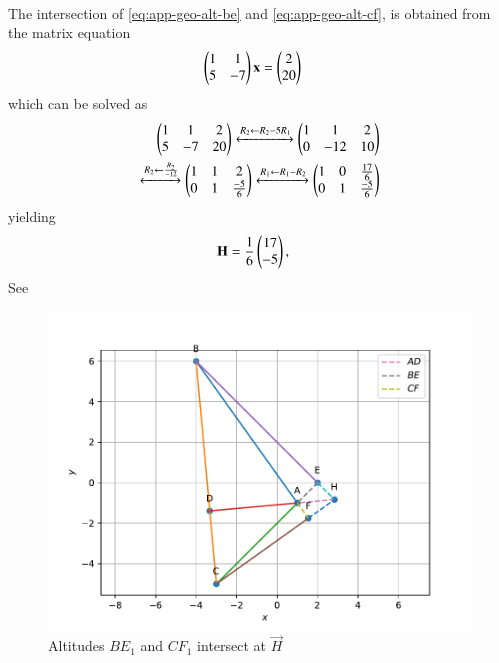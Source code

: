 \\ \solution
%
The intersection of 
		\eqref{eq:app-geo-alt-be}
		and
		\eqref{eq:app-geo-alt-cf},
		is obtained from 
		the matrix equation
\begin{align}
        \begin{pmatrix}1&1\\5&-7\end{pmatrix} \mathbf{x} &= \begin{pmatrix}2\\20\end{pmatrix}
\end{align}
%
which can be solved as 
%
\begin{align}
        \begin{pmatrix}1&1&2\\5&-7&20\end{pmatrix}
	 \xleftrightarrow[]{R_2 \leftarrow R_2 - 5R_1}
        \begin{pmatrix}1&1&2\\0&-12&10\end{pmatrix}\\
	 \xleftrightarrow[]{R_2 \leftarrow \frac{R_2}{-12}}
        \begin{pmatrix}1&1&2\\0&1&\frac{-5}{6}\end{pmatrix}
	 \xleftrightarrow[]{R_1 \leftarrow R_1 - R_2}
        \begin{pmatrix}1&0&\frac{17}{6}\\0&1&\frac{-5}{6}\end{pmatrix}
\end{align}
%
yielding
%
\begin{align}
        \mathbf{H}&=\frac{1}{6}\begin{pmatrix}{17}\\-{5}\end{pmatrix}
		\label{eq:app-geo-alt-H},
\end{align}
%
See 
\begin{figure}[!ht]
\centering
\includegraphics[width=\columnwidth]{figs/triangle/altitude.pdf}
\caption{Altitudes $BE_1$ and $CF_1$ intersect at $\vec{H}$}
\label{fig:m_tri_py}
\end{figure}

